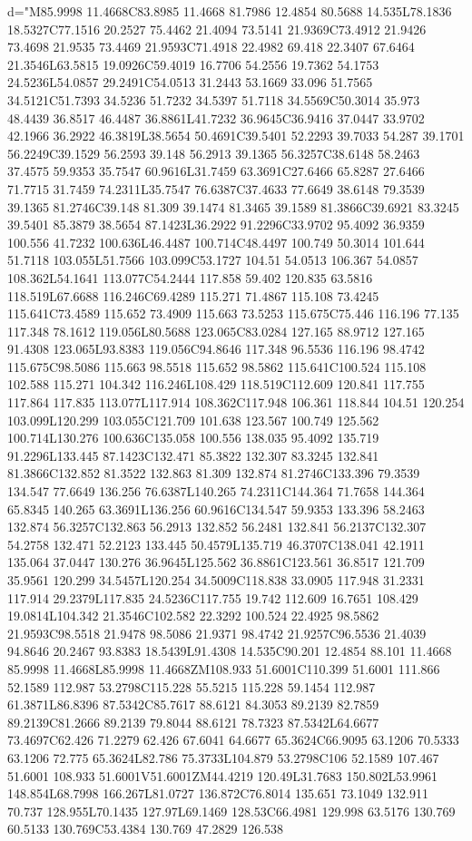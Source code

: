                       d="M85.9998 11.4668C83.8985 11.4668 81.7986 12.4854 80.5688 14.535L78.1836 18.5327C77.1516 20.2527 75.4462 21.4094 73.5141 21.9369C73.4912 21.9426 73.4698 21.9535 73.4469 21.9593C71.4918 22.4982 69.418 22.3407 67.6464 21.3546L63.5815 19.0926C59.4019 16.7706 54.2556 19.7362 54.1753 24.5236L54.0857 29.2491C54.0513 31.2443 53.1669 33.096 51.7565 34.5121C51.7393 34.5236 51.7232 34.5397 51.7118 34.5569C50.3014 35.973 48.4439 36.8517 46.4487 36.8861L41.7232 36.9645C36.9416 37.0447 33.9702 42.1966 36.2922 46.3819L38.5654 50.4691C39.5401 52.2293 39.7033 54.287 39.1701 56.2249C39.1529 56.2593 39.148 56.2913 39.1365 56.3257C38.6148 58.2463 37.4575 59.9353 35.7547 60.9616L31.7459 63.3691C27.6466 65.8287 27.6466 71.7715 31.7459 74.2311L35.7547 76.6387C37.4633 77.6649 38.6148 79.3539 39.1365 81.2746C39.148 81.309 39.1474 81.3465 39.1589 81.3866C39.6921 83.3245 39.5401 85.3879 38.5654 87.1423L36.2922 91.2296C33.9702 95.4092 36.9359 100.556 41.7232 100.636L46.4487 100.714C48.4497 100.749 50.3014 101.644 51.7118 103.055L51.7566 103.099C53.1727 104.51 54.0513 106.367 54.0857 108.362L54.1641 113.077C54.2444 117.858 59.402 120.835 63.5816 118.519L67.6688 116.246C69.4289 115.271 71.4867 115.108 73.4245 115.641C73.4589 115.652 73.4909 115.663 73.5253 115.675C75.446 116.196 77.135 117.348 78.1612 119.056L80.5688 123.065C83.0284 127.165 88.9712 127.165 91.4308 123.065L93.8383 119.056C94.8646 117.348 96.5536 116.196 98.4742 115.675C98.5086 115.663 98.5518 115.652 98.5862 115.641C100.524 115.108 102.588 115.271 104.342 116.246L108.429 118.519C112.609 120.841 117.755 117.864 117.835 113.077L117.914 108.362C117.948 106.361 118.844 104.51 120.254 103.099L120.299 103.055C121.709 101.638 123.567 100.749 125.562 100.714L130.276 100.636C135.058 100.556 138.035 95.4092 135.719 91.2296L133.445 87.1423C132.471 85.3822 132.307 83.3245 132.841 81.3866C132.852 81.3522 132.863 81.309 132.874 81.2746C133.396 79.3539 134.547 77.6649 136.256 76.6387L140.265 74.2311C144.364 71.7658 144.364 65.8345 140.265 63.3691L136.256 60.9616C134.547 59.9353 133.396 58.2463 132.874 56.3257C132.863 56.2913 132.852 56.2481 132.841 56.2137C132.307 54.2758 132.471 52.2123 133.445 50.4579L135.719 46.3707C138.041 42.1911 135.064 37.0447 130.276 36.9645L125.562 36.8861C123.561 36.8517 121.709 35.9561 120.299 34.5457L120.254 34.5009C118.838 33.0905 117.948 31.2331 117.914 29.2379L117.835 24.5236C117.755 19.742 112.609 16.7651 108.429 19.0814L104.342 21.3546C102.582 22.3292 100.524 22.4925 98.5862 21.9593C98.5518 21.9478 98.5086 21.9371 98.4742 21.9257C96.5536 21.4039 94.8646 20.2467 93.8383 18.5439L91.4308 14.535C90.201 12.4854 88.101 11.4668 85.9998 11.4668L85.9998 11.4668ZM108.933 51.6001C110.399 51.6001 111.866 52.1589 112.987 53.2798C115.228 55.5215 115.228 59.1454 112.987 61.3871L86.8396 87.5342C85.7617 88.6121 84.3053 89.2139 82.7859 89.2139C81.2666 89.2139 79.8044 88.6121 78.7323 87.5342L64.6677 73.4697C62.426 71.2279 62.426 67.6041 64.6677 65.3624C66.9095 63.1206 70.5333 63.1206 72.775 65.3624L82.786 75.3733L104.879 53.2798C106 52.1589 107.467 51.6001 108.933 51.6001V51.6001ZM44.4219 120.49L31.7683 150.802L53.9961 148.854L68.7998 166.267L81.0727 136.872C76.8014 135.651 73.1049 132.911 70.737 128.955L70.1435 127.97L69.1469 128.53C66.4981 129.998 63.5176 130.769 60.5133 130.769C53.4384 130.769 47.2829 126.538 